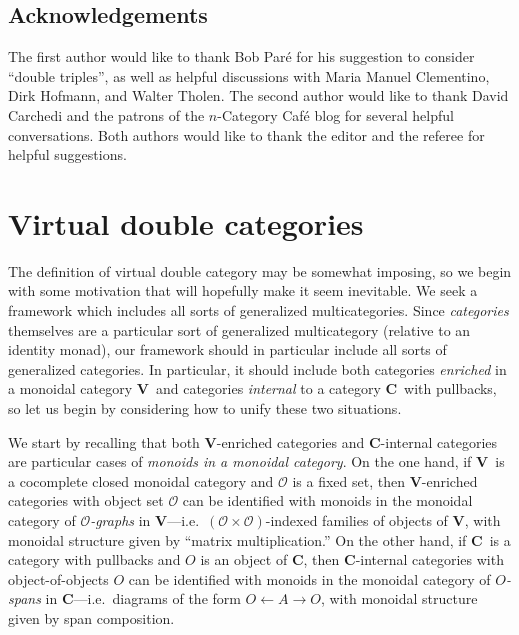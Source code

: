\documentclass{tac}
\makeatletter
\newcommand{\V}{\ensuremath{\mathbf{V}}}
\newcommand{\C}{\ensuremath{\mathbf{C}}}
\numberwithin{equation}{section}
\def\currthmtype{}
\let\old@label\label
\def\label#1{%
    {\let\your@currentlabel\@currentlabel%
      \edef\@currentlabel{\currthmtype}%
      \old@label{label@name@#1}}%
    \old@label{#1}}
\makeatother
\begin{document}
\subsection{Acknowledgements}
\label{sec:acknowledgements}

The first author would like to thank Bob Par\'e for his suggestion to
consider ``double triples'', as well as helpful discussions with Maria
Manuel Clementino, Dirk Hofmann, and Walter Tholen.  The second author
would like to thank David Carchedi and the patrons of the $n$-Category
Caf\'e blog for several helpful conversations.  Both authors would like
to thank the editor and the referee for helpful suggestions.





\section{Virtual double categories}
\label{sec:fcmulticats}

The definition of virtual double category may be somewhat imposing, so
we begin with some motivation that will hopefully make it seem
inevitable.  We seek a framework which includes all sorts of
generalized multicategories.  Since \emph{categories} themselves are a
particular sort of generalized multicategory (relative to an identity
monad), our framework should in particular include all sorts of
generalized categories.  In particular, it should include both
categories \emph{enriched} in a monoidal category \V\ and categories
\emph{internal} to a category \C\ with pullbacks, so let us begin by
considering how to unify these two situations.

We start by recalling that both \V-enriched categories and \C-internal
categories are particular cases of \emph{monoids in a monoidal
  category}.  On the one hand, if \V\ is a cocomplete closed monoidal
category and $\mathcal{O}$ is a fixed set, then \V-enriched categories
with object set $\mathcal{O}$ can be identified with monoids in the
monoidal category of \emph{$\mathcal{O}$-graphs} in \V---i.e.\
$(\mathcal{O}\times\mathcal{O})$-indexed families of objects of \V, with
monoidal structure given by ``matrix multiplication.''  On the other
hand, if \C\ is a category with pullbacks and $O$ is an object of \C,
then \C-internal categories with object-of-objects $O$ can be identified
with monoids in the monoidal category of \emph{$O$-spans} in \C---i.e.\
diagrams of the form $O \leftarrow A \rightarrow O$, with monoidal
structure given by span composition.
\end{document}
